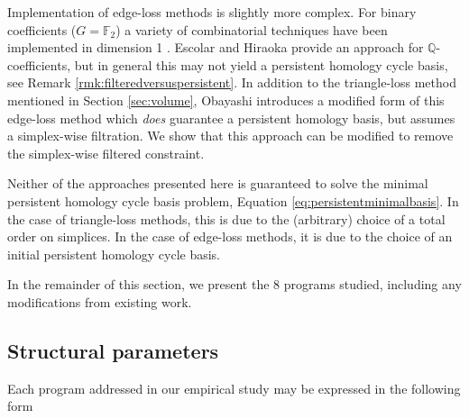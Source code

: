 \documentclass[11pt,onecolumn]{article}
\newcommand{\Q}{\mathbb{Q}}
\newcommand{\field}{\mathbb{F}}
\newcommand{\se}{Section }
\newcommand{\eq}{Equation }
\theoremstyle{plain}
\theoremstyle{definition}
\begin{document}
Implementation of edge-loss methods is slightly more complex.  For binary coefficients ($G = \field_2$) a variety of combinatorial techniques have been implemented in dimension 1 \cite{chenquantifying, zhang2019heuristic}.  Escolar and Hiraoka \cite{Escolar2016} provide an approach for $\Q$-coefficients, but in general this may not yield a persistent homology cycle basis, see Remark \ref{rmk:filteredversuspersistent}.   
In addition to the triangle-loss method mentioned in \se \ref{sec:volume}, Obayashi \cite{Obayashi2018} introduces a modified form of this edge-loss method which \emph{does} guarantee a persistent homology basis, but assumes a simplex-wise filtration.  We show that this approach can be modified to remove the simplex-wise filtered constraint.

Neither of the approaches presented here is guaranteed to solve the minimal persistent homology cycle basis problem, \eq \eqref{eq:persistentminimalbasis}.  In the case of triangle-loss methods, this is due to the (arbitrary) choice of a total order on simplices.  In the case of edge-loss methods, it is due to the choice of an initial persistent homology cycle basis.  

In the remainder of this section, we present the 8 programs studied, including any modifications from existing work.

\subsection{Structural parameters}
\label{sec_structuralparams}

Each program addressed in our empirical study may be expressed in the following form
 
\end{document}
